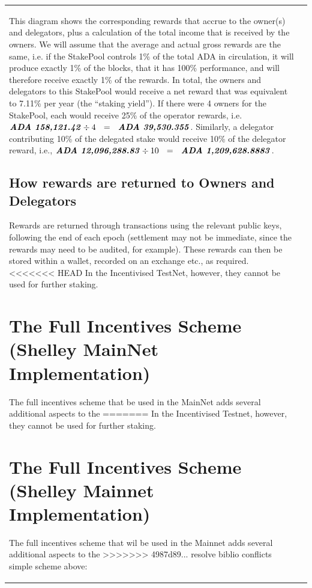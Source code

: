 \documentclass[11pt,a4paper,dvipsnames,twosided,final]{article}
\newcommand{\khcomment}[1]{\todo[color=blue!20]{KH: #1}}
\newcommand{\ada}{ADA{}}
\newcommand{\ADA}[1]{\textbf{\emph{\ada~{#1}}}}
\begin{document}
\begin{tabular}{||l|l||}
\noindent
This diagram shows the corresponding rewards that accrue to the owner(s) and delegators,
plus a calculation of the total income that is received by the owners.  We will assume that the average
and actual gross rewards are the same, i.e. if the StakePool controls 1\% of the total \ada{} in
circulation, it will produce exactly 1\% of the blocks, that it has 100\% performance, and will therefore receive exactly 1\% of the rewards.
In total, the
owners and delegators to this StakePool would receive a net reward that was equivalent to 7.11\% per year
(the ``staking yield'').  If there were 4 owners for the StakePool, each would receive
25\% of the operator rewards, i.e. $\ADA{158,121.42} \div 4 ~~=~~ \ADA{39,530.355}$.
Similarly, a delegator contributing 10\% of the delegated stake would receive 10\% of
the delegator reward, i.e., $\ADA{12,096,288.83} \div 10 ~~=~~ \ADA{1,209,628.8883}$.


\subsection{How rewards are returned to Owners and Delegators}
\label{sec:rewards-return}

Rewards are returned through transactions using the relevant public keys, following the end
of each epoch (settlement may not be immediate, since the rewards may need to be audited, for example).
These rewards can then be stored within a wallet, recorded on an exchange etc., as required.
<<<<<<< HEAD
In the Incentivised TestNet, however, they cannot be used for further staking.
\khcomment{JC/MG to expand}

\clearpage
\section{The Full Incentives  Scheme (Shelley MainNet Implementation)}
\label{sec:MainNet}

The full incentives scheme that  be used in the MainNet adds several additional aspects to the
=======
In the Incentivised Testnet, however, they cannot be used for further staking.
\khcomment{JC/MG to expand}

\clearpage
\section{The Full Incentives  Scheme (Shelley Mainnet Implementation)}
\label{sec:Mainnet}

The full incentives scheme that wil be used in the Mainnet adds several additional aspects to the
>>>>>>> 4987d89... resolve biblio conflicts
simple scheme above:


\end{tabular}
\end{document}
